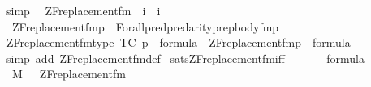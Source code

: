 \begin{isabellebody}
\ simp%
\endisatagproof
{\isafoldproof}%
%
\isadelimproof
\isanewline
%
\endisadelimproof
\isanewline
{}\isamarkupfalse%
\isanewline
\ \ ZF{\isacharunderscore}{\kern0pt}replacement{\isacharunderscore}{\kern0pt}fm\ {\isacharcolon}{\kern0pt}{\isacharcolon}{\kern0pt}\ {\isachardoublequoteopen}i\ {\isasymRightarrow}\ i{\isachardoublequoteclose}\ \isanewline
\ \ {\isachardoublequoteopen}ZF{\isacharunderscore}{\kern0pt}replacement{\isacharunderscore}{\kern0pt}fm{\isacharparenleft}{\kern0pt}p{\isacharparenright}{\kern0pt}\ {\isasymequiv}\ Forall{\isacharcircum}{\kern0pt}{\isacharparenleft}{\kern0pt}pred{\isacharparenleft}{\kern0pt}pred{\isacharparenleft}{\kern0pt}arity{\isacharparenleft}{\kern0pt}p{\isacharparenright}{\kern0pt}{\isacharparenright}{\kern0pt}{\isacharparenright}{\kern0pt}{\isacharparenright}{\kern0pt}{\isacharparenleft}{\kern0pt}rep{\isacharunderscore}{\kern0pt}body{\isacharunderscore}{\kern0pt}fm{\isacharparenleft}{\kern0pt}p{\isacharparenright}{\kern0pt}{\isacharparenright}{\kern0pt}{\isachardoublequoteclose}\isanewline
\isanewline
{}\isamarkupfalse%
\ ZF{\isacharunderscore}{\kern0pt}replacement{\isacharunderscore}{\kern0pt}fm{\isacharunderscore}{\kern0pt}type\ {\isacharbrackleft}{\kern0pt}TC{\isacharbrackright}{\kern0pt}{\isacharcolon}{\kern0pt}\ {\isachardoublequoteopen}p\ {\isasymin}\ formula\ {\isasymLongrightarrow}\ ZF{\isacharunderscore}{\kern0pt}replacement{\isacharunderscore}{\kern0pt}fm{\isacharparenleft}{\kern0pt}p{\isacharparenright}{\kern0pt}\ {\isasymin}\ formula{\isachardoublequoteclose}\isanewline
%
\isadelimproof
\ \ %
\endisadelimproof
%
\isatagproof
{}\isamarkupfalse%
\ {\isacharparenleft}{\kern0pt}simp\ add{\isacharcolon}{\kern0pt}\ ZF{\isacharunderscore}{\kern0pt}replacement{\isacharunderscore}{\kern0pt}fm{\isacharunderscore}{\kern0pt}def{\isacharparenright}{\kern0pt}%
\endisatagproof
{\isafoldproof}%
%
\isadelimproof
\isanewline
%
\endisadelimproof
\isanewline
{}\isamarkupfalse%
\ sats{\isacharunderscore}{\kern0pt}ZF{\isacharunderscore}{\kern0pt}replacement{\isacharunderscore}{\kern0pt}fm{\isacharunderscore}{\kern0pt}iff{\isacharcolon}{\kern0pt}\isanewline
\ \ \isanewline
\ \ \ \ {\isachardoublequoteopen}{\isasymphi}{\isasymin}formula{\isachardoublequoteclose}\isanewline
\ \ \isanewline
\ \ {\isachardoublequoteopen}{\isacharparenleft}{\kern0pt}M{\isacharcomma}{\kern0pt}\ {\isacharbrackleft}{\kern0pt}{\isacharbrackright}{\kern0pt}\ {\isasymTurnstile}\ {\isacharparenleft}{\kern0pt}ZF{\isacharunderscore}{\kern0pt}replacement{\isacharunderscore}{\kern0pt}fm{\isacharparenleft}{\kern0pt}{\isasymphi}{\isacharparenright}{\kern0pt}{\isacharparenright}{\kern0pt}{\isacharparenright}{\kern0pt}\isanewline

\end{isabellebody}
